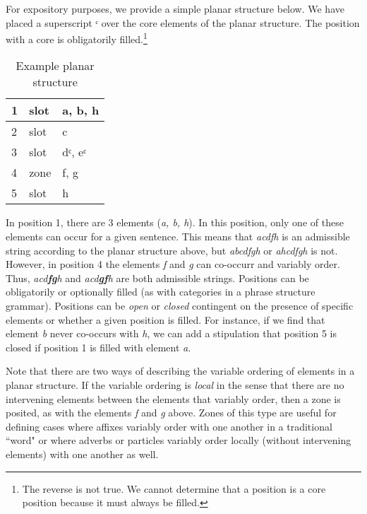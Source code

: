 \documentclass[output=paper,draftmode]{langscibook}
\begin{document}
For expository purposes, we provide a simple planar structure below. We have placed a superscript ᶜ over the core elements of the planar structure. The position with a core is obligatorily filled.\footnote{The reverse is not true. We cannot determine that a position is a core position because it must always be filled.}

\begin{table}[]
\caption{Example planar structure}
\label{tab:planarstructuretoy}
\begin{tabular}{|l|l|l|}
\hline
1\strut & slot & a, b, h \\ \hline
2\strut & slot & c        \\ \hline
3\strut & slot & dᶜ, eᶜ      \\ \hline
4\strut & zone & f, g      \\ \hline
5\strut & slot & h        \\ \hline
\end{tabular}
\end{table}

In position 1, there are 3 elements (\textit{a, b, h}). In this position, only one of these elements can occur for a given sentence. This means that \textit{acdfh} is an admissible string according to the planar structure above, but \textit{abcdfgh} or \textit{ahcdfgh} is not. 
However, in position 4 the elements \textit{f} and \textit{g} can co-occurr and variably order. Thus, \textit{acd\textbf{fg}h} and \textit{acd\textbf{gf}h} are both admissible strings.
Positions can be obligatorily or optionally filled (as with categories in a phrase structure grammar). Positions can be \textit{open} or \textit{closed} contingent on the presence of specific elements or whether a given position is filled. For instance, if we find that element \textit{b} never co-occurs with \textit{h}, we can add a stipulation that position 5 is closed if position 1 is filled with element \textit{a}. 

Note that there are two ways of describing the variable ordering of elements in a planar structure. If the variable ordering is \textit{local} in the sense that there are no intervening elements between the elements that variably order, then a zone is posited, as with the elements \textit{f} and \textit{g} above. Zones of this type are useful for defining cases where affixes variably order with one another \citep{bickeletal:2007} in a traditional ``word" or where adverbs or particles variably order locally (without intervening elements) with one another as well.
\end{document}
